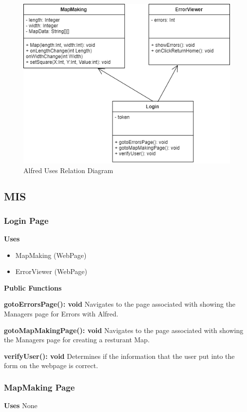 \documentclass [10pt]{article}
\begin{document}
\begin{figure} [h!]
	\centering
	\includegraphics [scale = 0.4] {figures/Manager_UsesDiagram.png}
	\caption{Alfred Uses Relation Diagram}
\end{figure}

\subsection{MIS}

\subsubsection{Login Page}
\textbf{Uses}
\begin{itemize}
	\item MapMaking (WebPage)
	\item ErrorViewer (WebPage)
\end{itemize}



\textbf{Public Functions}

\textbf{gotoErrorsPage(): void}
Navigates to the page associated with showing the Managers page for Errors with Alfred.

\textbf{gotoMapMakingPage(): void}
Navigates to the page associated with showing the Managers page for creating a resturant Map.

\textbf{verifyUser(): void}
Determines if the information that the user put into the form on the webpage is correct.


\subsubsection{MapMaking Page}
\textbf{Uses}
None
\end{document}
